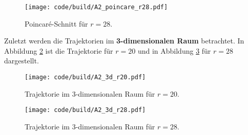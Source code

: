 \begin{figure}
    \centering
    \texttt{[image: code/build/A2\_poincare\_r28.pdf]}
    \caption{Poincaré-Schnitt für $r = 28$.}
    \label{fig:A2_lorenz_poincare28}
\end{figure}
\FloatBarrier

Zuletzt werden die Trajektorien im \textbf{3-dimensionalen Raum} betrachtet.
In Abbildung \ref{fig:A2_lorenz3d20} ist die Trajektorie für $r = 20$ und in Abbildung \ref{fig:A2_lorenz3d28} für $r = 28$ dargestellt.
\begin{figure}
    \centering
    \texttt{[image: code/build/A2\_3d\_r20.pdf]}
    \caption{Trajektorie im 3-dimensionalen Raum für $r = 20$.}
    \label{fig:A2_lorenz3d20}
\end{figure}

\begin{figure}
    \centering
    \texttt{[image: code/build/A2\_3d\_r28.pdf]}
    \caption{Trajektorie im 3-dimensionalen Raum für $r = 28$.}
    \label{fig:A2_lorenz3d28}
\end{figure}
\FloatBarrier

